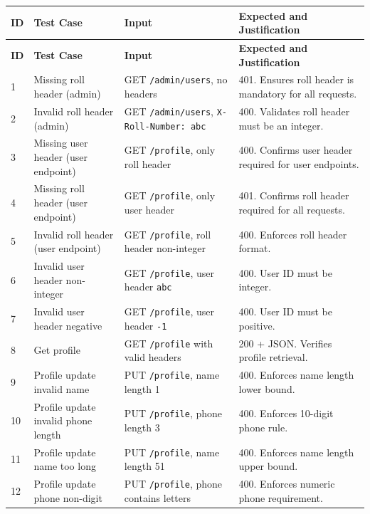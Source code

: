 \documentclass[11pt]{article}
\begin{document}
\renewcommand{\arraystretch}{1.2}
\setlength{\tabcolsep}{6pt}
\begin{longtable}{|p{0.7cm}|p{3.2cm}|p{6.7cm}|p{3.2cm}|}
\hline
\textbf{ID} & \textbf{Test Case} & \textbf{Input} & \textbf{Expected and Justification} \\
\hline
\endfirsthead
\hline
\textbf{ID} & \textbf{Test Case} & \textbf{Input} & \textbf{Expected and Justification} \\
\hline
\endhead
\hline
\endfoot

1 & Missing roll header (admin) & GET \texttt{/admin/users}, no headers & 401. Ensures roll header is mandatory for all requests. \\
\hline
2 & Invalid roll header (admin) & GET \texttt{/admin/users}, \texttt{X-Roll-Number: abc} & 400. Validates roll header must be an integer. \\
\hline
3 & Missing user header (user endpoint) & GET \texttt{/profile}, only roll header & 400. Confirms user header required for user endpoints. \\
\hline
4 & Missing roll header (user endpoint) & GET \texttt{/profile}, only user header & 401. Confirms roll header required for all requests. \\
\hline
5 & Invalid roll header (user endpoint) & GET \texttt{/profile}, roll header non-integer & 400. Enforces roll header format. \\
\hline
6 & Invalid user header non-integer & GET \texttt{/profile}, user header \texttt{abc} & 400. User ID must be integer. \\
\hline
7 & Invalid user header negative & GET \texttt{/profile}, user header \texttt{-1} & 400. User ID must be positive. \\
\hline
8 & Get profile & GET \texttt{/profile} with valid headers & 200 + JSON. Verifies profile retrieval. \\
\hline
9 & Profile update invalid name & PUT \texttt{/profile}, name length 1 & 400. Enforces name length lower bound. \\
\hline
10 & Profile update invalid phone length & PUT \texttt{/profile}, phone length 3 & 400. Enforces 10-digit phone rule. \\
\hline
11 & Profile update name too long & PUT \texttt{/profile}, name length 51 & 400. Enforces name length upper bound. \\
\hline
12 & Profile update phone non-digit & PUT \texttt{/profile}, phone contains letters & 400. Enforces numeric phone requirement. \\
\hline

\end{longtable}
\end{document}
